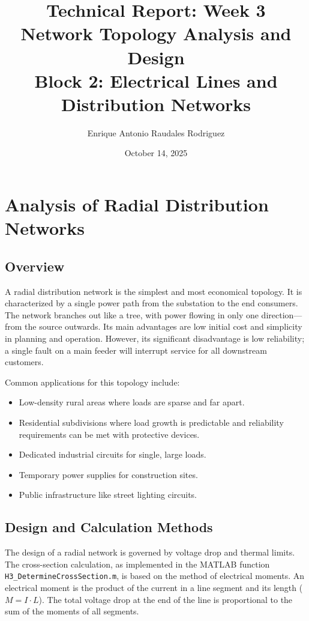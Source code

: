 \documentclass[12pt, a4paper]{article}
\title{
    \vspace{2cm}
    \textbf{Technical Report: Week 3 \\ Network Topology Analysis and Design} \\
    \large{Block 2: Electrical Lines and Distribution Networks}
    \vspace{3cm}
}
\author{Enrique Antonio Raudales Rodriguez}
\date{October 14, 2025}
\begin{document}
\begin{titlepage}
    \maketitle
\end{titlepage}
\thispagestyle{empty}

\newpage
\tableofcontents
\thispagestyle{empty}
\newpage

\pagestyle{fancy} %

\section{Analysis of Radial Distribution Networks}
\subsection{Overview}
A radial distribution network is the simplest and most economical topology. It is characterized by a single power path from the substation to the end consumers. The network branches out like a tree, with power flowing in only one direction—from the source outwards. Its main advantages are low initial cost and simplicity in planning and operation. However, its significant disadvantage is low reliability; a single fault on a main feeder will interrupt service for all downstream customers.

Common applications for this topology include:
\begin{itemize}
    \item Low-density rural areas where loads are sparse and far apart.
    \item Residential subdivisions where load growth is predictable and reliability requirements can be met with protective devices.
    \item Dedicated industrial circuits for single, large loads.
    \item Temporary power supplies for construction sites.
    \item Public infrastructure like street lighting circuits.
\end{itemize}

\subsection{Design and Calculation Methods}
The design of a radial network is governed by voltage drop and thermal limits. The cross-section calculation, as implemented in the MATLAB function \texttt{H3\_DetermineCrossSection.m}, is based on the method of electrical moments. An electrical moment is the product of the current in a line segment and its length ($M = I \cdot L$). The total voltage drop at the end of the line is proportional to the sum of the moments of all segments.
\end{document}
